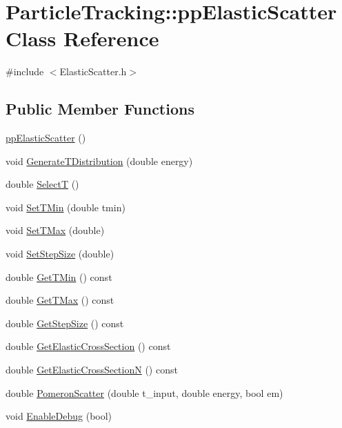 \hypertarget{classParticleTracking_1_1ppElasticScatter}{}\section{Particle\+Tracking\+:\+:pp\+Elastic\+Scatter Class Reference}
\label{classParticleTracking_1_1ppElasticScatter}


{\ttfamily \#include $<$Elastic\+Scatter.\+h$>$}

\subsection*{Public Member Functions}
\begin{DoxyCompactItemize}
\item 
\hyperlink{classParticleTracking_1_1ppElasticScatter_a930b5acccec4e874db62a1e02d57bc91}{pp\+Elastic\+Scatter} ()
\item 
void \hyperlink{classParticleTracking_1_1ppElasticScatter_a95591a767306079a5737f57196139913}{Generate\+T\+Distribution} (double energy)
\item 
double \hyperlink{classParticleTracking_1_1ppElasticScatter_a7ca2a62dcdda44c0164cd0f4123bb140}{SelectT} ()
\item 
void \hyperlink{classParticleTracking_1_1ppElasticScatter_a0fc4f960f8ace37fe3c40f7c0e4bf97f}{Set\+T\+Min} (double tmin)
\item 
void \hyperlink{classParticleTracking_1_1ppElasticScatter_adabfe6cd2a5037abc49907b0e0307ecb}{Set\+T\+Max} (double)
\item 
void \hyperlink{classParticleTracking_1_1ppElasticScatter_ace72bdc553b86f4b2f29af9c14aa0b7c}{Set\+Step\+Size} (double)
\item 
double \hyperlink{classParticleTracking_1_1ppElasticScatter_a016346b9a16ef5c2b350f55dacc0d1b8}{Get\+T\+Min} () const
\item 
double \hyperlink{classParticleTracking_1_1ppElasticScatter_ace630973adc2e78e6db1a4e3cad947a1}{Get\+T\+Max} () const
\item 
double \hyperlink{classParticleTracking_1_1ppElasticScatter_af79d46e64c83d0953d4e42e0352d3945}{Get\+Step\+Size} () const
\item 
double \hyperlink{classParticleTracking_1_1ppElasticScatter_abcd733dbd562e6cf8ad66ab2dd087a28}{Get\+Elastic\+Cross\+Section} () const
\item 
double \hyperlink{classParticleTracking_1_1ppElasticScatter_ad65098d6677e1867b24f8ab815d173b9}{Get\+Elastic\+Cross\+SectionN} () const
\item 
double \hyperlink{classParticleTracking_1_1ppElasticScatter_a86e3e9ad3f0d852e1e2244be5db49547}{Pomeron\+Scatter} (double t\+\_\+input, double energy, bool em)
\item 
void \hyperlink{classParticleTracking_1_1ppElasticScatter_a064b2815b165071e41183abd2e0ff5c7}{Enable\+Debug} (bool)
\end{DoxyCompactItemize}


